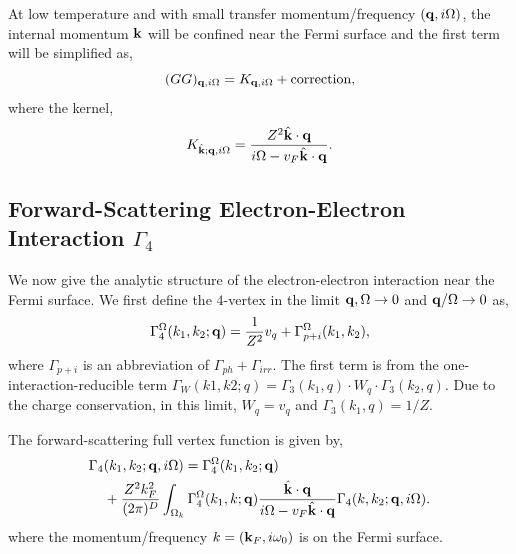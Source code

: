 \documentclass[reprint,amsmath,amssymb,aps,prb]{revtex4-1}
\begin{document}
At low temperature and with small transfer momentum/frequency $(\mathbf{q}, i\Omega)$, the internal momentum $\mathbf{k}$ will be confined near the Fermi surface and the first term will be simplified as,
\begin{equation}
    (GG)_{\mathbf{q},i\Omega}=K_{\mathbf{q},i\Omega}+\text{correction},
\end{equation}
where the kernel,
\begin{equation}
    K_{\hat{\mathbf{k}}; \mathbf{q},i\Omega}=\frac{Z^2\hat{\mathbf{k}}\cdot \mathbf{q}}{i\Omega-v_F \hat{\mathbf{k}}\cdot \mathbf{q}}.
\end{equation}


\subsection{Forward-Scattering Electron-Electron Interaction $\Gamma_4$}
\label{appendix:renormalization}

We now give the analytic structure of the electron-electron interaction near the Fermi surface. We first define the $4$-vertex in the limit $\mathbf{q}, \Omega\rightarrow 0$ and $\mathbf{q}/\Omega \rightarrow 0$ as,
\begin{equation}
    \label{eq:gamma_4_omega}
    \Gamma_4^\Omega (k_1, k_2; \mathbf{q})=\frac{1}{Z^2}v_q+\Gamma_{p+i}^\Omega(k_1, k_2),
\end{equation}
where $\Gamma_{p+i}$ is an abbreviation of $\Gamma_{ph}+\Gamma_{irr}$. The first term is from the one-interaction-reducible term $\Gamma_W (k1, k2; q)=\Gamma_3(k_1, q) \cdot W_q \cdot \Gamma_3(k_2, q)$. Due to the charge conservation\cite{agd}, in this limit, $W_q=v_q$ and $\Gamma_3(k_1, q)=1/Z$.

The forward-scattering full vertex function is given by,
\begin{align}
    \Gamma_4 & (k_1, k_2; \mathbf{q}, i\Omega)=\Gamma_4^\Omega(k_1, k_2; \mathbf{q}) \nonumber \\&
    +\frac{Z^2k_F^2}{(2\pi)^D} \int_{\Omega_k} \Gamma_4^\Omega(k_1, k; \mathbf{q})\frac{\hat{\mathbf{k}}\cdot \mathbf{q}}{i\Omega-v_F \hat{\mathbf{k}}\cdot \mathbf{q}}\Gamma_4(k, k_2; \mathbf{q}, i\Omega).
\end{align}
where the momentum/frequency $k=(\mathbf{k}_F, i\omega_0)$ is on the Fermi surface.
\end{document}
